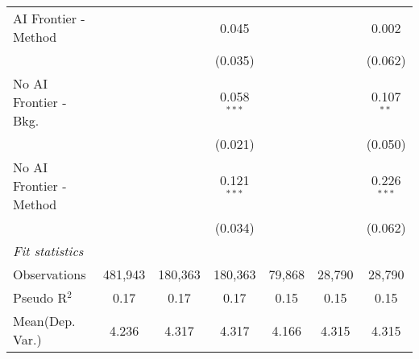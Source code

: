 \begin{tabular}{lcccccc}
   AI Frontier - Method    &               &               & 0.045         &               &               & 0.002\\   
                           &               &               & (0.035)       &               &               & (0.062)\\   
   No AI Frontier - Bkg.   &               &               & 0.058$^{***}$ &               &               & 0.107$^{**}$\\   
                           &               &               & (0.021)       &               &               & (0.050)\\   
   No AI Frontier - Method &               &               & 0.121$^{***}$ &               &               & 0.226$^{***}$\\   
                           &               &               & (0.034)       &               &               & (0.062)\\   
   \midrule
   \emph{Fit statistics}\\
   Observations            & 481,943       & 180,363       & 180,363       & 79,868        & 28,790        & 28,790\\  
   Pseudo R$^2$            & 0.17          & 0.17          & 0.17          & 0.15          & 0.15          & 0.15\\  
Mean(Dep. Var.) & 4.236 & 4.317 & 4.317 & 4.166 & 4.315 & 4.315 \\
   

\end{tabular}
